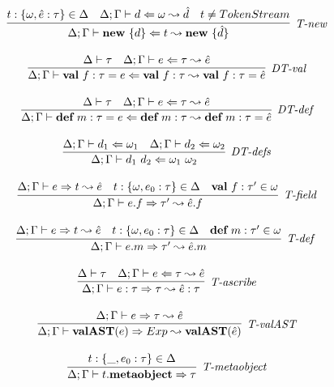\begin{figure}
\centering
\[
\begin{array}{c}

\infer[\textit{T-new}]
	{\Delta; \Gamma \vdash \keyw{new}\ \{ d \} \Leftarrow  t \leadsto \keyw{new}\ \{\hat d\}}
	{ t:\{\omega, \hat e:\tau\} \in \Delta & \Delta;\Gamma \vdash d \Leftarrow \omega \leadsto \hat d & t\neq TokenStream} \\[3ex]

\infer[\textit{DT-val}]
	{\Delta; \Gamma \vdash \keyw{val}~ f:\tau = e \Leftarrow \keyw{val}~ f:\tau  \leadsto \keyw{val}~ f:\tau = \hat{e}}
	{\Delta \vdash \tau &\Delta; \Gamma \vdash e \Leftarrow \tau \leadsto \hat{e} } \\[3ex]
	
\infer[\textit{DT-def}]
	{\Delta; \Gamma \vdash \keyw{def}~ m:\tau = e \Leftarrow \keyw{def}~ m:\tau \leadsto \keyw{def}~ m:\tau = \hat{e} }
	{\Delta \vdash \tau  & \Delta; \Gamma \vdash e  \Leftarrow \tau \leadsto \hat{e} } \\[3ex]

	
\infer[\textit{DT-defs}]
	{\Delta; \Gamma \vdash d_1\ d_2 \Leftarrow \omega_1\ \omega_2 }
	{\Delta; \Gamma \vdash d_1 \Leftarrow \omega_1 &  \Delta; \Gamma \vdash d_2 \Leftarrow \omega_2 } \\[3ex]


\infer[\textit{T-field}]
	{\Delta; \Gamma \vdash  e.f \Rightarrow \tau' \leadsto \hat{e}.f} 
	{\Delta; \Gamma \vdash e \Rightarrow t \leadsto \hat{e} & t:\{\omega, e_0:\tau\}\in \Delta & \keyw{val}\ f:\tau' \in \omega  }\\[3ex]

 
\infer[\textit{T-def }]
	{\Delta; \Gamma \vdash  e.m \Rightarrow \tau' \leadsto \hat{e}.m} 
	{\Delta; \Gamma \vdash e \Rightarrow t \leadsto \hat{e} & t: \{\omega, e_0:\tau\} \in \Delta & \keyw{def}\ m:\tau' \in \omega }\\[3ex]

\infer[\textit{T-ascribe}]
	{\Delta; \Gamma  \vdash  e:\tau \Rightarrow \tau \leadsto \hat{e}:\tau}
	{\Delta \vdash \tau & \Delta; \Gamma \vdash e \Leftarrow \tau \leadsto \hat{e} } \\[3ex]

\infer[\textit{T-valAST}]
        {\Delta; \Gamma \vdash \keyw{valAST}(e) \Rightarrow Exp \leadsto \keyw{valAST}(\hat{e}) }
	{\Delta; \Gamma \vdash e \Rightarrow \tau \leadsto \hat{e}} \\[3ex]

\infer[\textit{T-metaobject}]
        {\Delta; \Gamma \vdash t.\keyw{metaobject} \Rightarrow \tau   }
	{t:\{\_, e_0:\tau\} \in \Delta} \\[3ex]



\end{array}\]
\end{figure}
